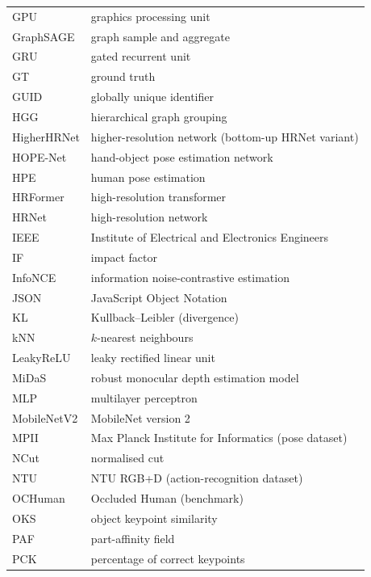 {\begin{longtable}{p{3cm}l}
    GPU            & graphics processing unit \\
    GraphSAGE      & graph sample and aggregate \\
    GRU            & gated recurrent unit \\
    GT             & ground truth \\
    GUID           & globally unique identifier \\
    HGG            & hierarchical graph grouping \\
    HigherHRNet    & higher-resolution network (bottom-up HRNet variant) \\
    HOPE-Net       & hand-object pose estimation network \\
    HPE            & human pose estimation \\
    HRFormer       & high-resolution transformer \\
    HRNet          & high-resolution network \\
    IEEE           & Institute of Electrical and Electronics Engineers \\
    IF             & impact factor \\
    InfoNCE        & information noise-contrastive estimation \\
    JSON           & JavaScript Object Notation \\
    KL             & Kullback--Leibler (divergence) \\
    kNN            & $k$-nearest neighbours \\
    LeakyReLU      & leaky rectified linear unit \\
    MiDaS          & robust monocular depth estimation model \\
    MLP            & multilayer perceptron \\
    MobileNetV2    & MobileNet version 2 \\
    MPII           & Max Planck Institute for Informatics (pose dataset) \\
    NCut           & normalised cut \\
    NTU            & NTU RGB+D (action-recognition dataset) \\
    OCHuman        & Occluded Human (benchmark) \\
    OKS            & object keypoint similarity \\
    PAF            & part-affinity field \\
    PCK            & percentage of correct keypoints \\

\end{longtable}}
